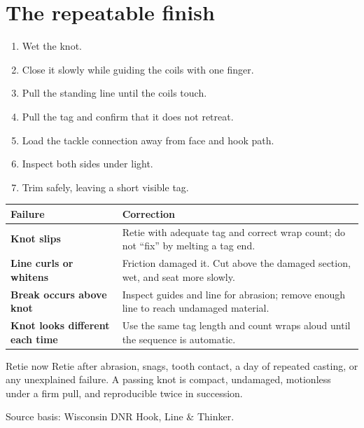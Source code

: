 \section{The repeatable finish}
\begin{enumerate}
\item Wet the knot.
\item Close it slowly while guiding the coils with one finger.
\item Pull the standing line until the coils touch.
\item Pull the tag and confirm that it does not retreat.
\item Load the tackle connection away from face and hook path.
\item Inspect both sides under light.
\item Trim safely, leaving a short visible tag.
\end{enumerate}
\begin{tabularx}{\linewidth}{@{}>{\bfseries}p{.25\linewidth}X@{}}
\toprule Failure&Correction\\\midrule
Knot slips&Retie with adequate tag and correct wrap count; do not “fix” by
melting a tag end.\\
Line curls or whitens&Friction damaged it. Cut above the damaged section, wet,
and seat more slowly.\\
Break occurs above knot&Inspect guides and line for abrasion; remove enough
line to reach undamaged material.\\
Knot looks different each time&Use the same tag length and count wraps aloud
until the sequence is automatic.\\
\bottomrule
\end{tabularx}
\begin{telospanel}{Retie now}
Retie after abrasion, snags, tooth contact, a day of repeated casting, or any
unexplained failure. A passing knot is compact, undamaged, motionless under a
firm pull, and reproducible twice in succession.
\end{telospanel}

\small Source basis: Wisconsin DNR Hook, Line \& Thinker.

